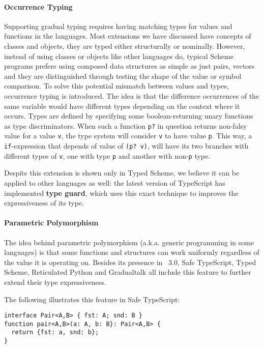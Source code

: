 \paragraph{Occurrence Typing}

Supporting gradual typing requires having matching types for values and functions in the languages.
Most extensions we have discussed have concepts of classes and objects, they are typed either
structurally or nominally.
However, instead of using classes or objects like other languages do,
typical Scheme programs prefers using composed data structures as simple as just pairs, vectors
and they are distinguished through testing the shape of the value or symbol comparison.
To solve this potential mismatch between values and types, occurrence typing is introduced.
The idea is that the difference occurrences of the same variable would have different types
depending on the context where it occurs.
Types are defined by specifying some boolean-returning unary functions as type discriminators.
When such a function \texttt{p?} in question returns non-falsy value for a value \texttt{v},
the type system will consider \texttt{v} to have value \texttt{p}.
This way, a \texttt{if}-expression that depends of value of \texttt{(p? v)},
will have its two branches with different types of \texttt{v}, one with type \texttt{p}
and another with non-\texttt{p} type.

Despite this extension is shown only in Typed Scheme, we believe it can be applied to other languages
as well: the latest version of TypeScript
has implemented \textbf{type guard}\cite{ts2018},
which uses this exact technique to improves
the expressiveness of its type.

\paragraph{Parametric Polymorphism}

The idea behind parametric polymorphism
(a.k.a. generic programming in some languages)
is that some functions and structures can
work uniformly regardless of the value it is operating on.
Besides its presence in \csharp\ 3.0,
Safe TypeScript, Typed Scheme, Reticulated Python and Gradualtalk all include
this feature to further extend their type expressiveness.

The following illustrates this feature in Safe TypeScript:

\begin{verbatim}
interface Pair<A,B> { fst: A; snd: B }
function pair<A,B>(a: A, b: B}: Pair<A,B> {
  return {fst: a, snd: b};
}
\end{verbatim}


